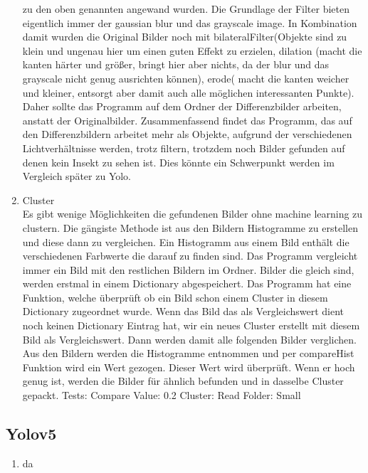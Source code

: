 \documentclass[11pt]{scrartcl}
\begin{document}
\begin{enumerate}
    zu den oben genannten angewand wurden. Die Grundlage der Filter bieten eigentlich immer der gaussian blur und das grayscale image. 
    In Kombination damit wurden die Original Bilder noch mit bilateralFilter(Objekte sind zu klein und ungenau hier um einen guten Effekt zu erzielen,
    dilation (macht die kanten härter und größer, bringt hier aber nichts, da der blur und das grayscale nicht genug ausrichten können),
    erode( macht die kanten weicher und kleiner, entsorgt aber damit auch alle möglichen interessanten Punkte).
    Daher sollte das Programm auf dem Ordner der Differenzbilder arbeiten, anstatt der Originalbilder.
    Zusammenfassend findet das Programm, das auf den Differenzbildern arbeitet mehr als Objekte, aufgrund der verschiedenen Lichtverhältnisse
    werden, trotz filtern, trotzdem noch Bilder gefunden auf denen kein Insekt zu sehen ist. Dies könnte ein Schwerpunkt werden im Vergleich später
    zu Yolo.
    \item Cluster \\
    Es gibt wenige Möglichkeiten die gefundenen Bilder ohne machine learning zu clustern. Die gängiste Methode ist aus den Bildern Histogramme zu erstellen und diese
    dann zu vergleichen. Ein Histogramm aus einem Bild enthält die verschiedenen Farbwerte die darauf zu finden sind. Das Programm vergleicht immer ein Bild mit den restlichen Bildern
    im Ordner. Bilder die gleich sind, werden erstmal in einem Dictionary abgespeichert. Das Programm hat eine Funktion, welche überprüft ob ein Bild
    schon einem Cluster in diesem Dictionary zugeordnet wurde. Wenn das Bild das als Vergleichswert dient noch keinen Dictionary Eintrag hat, wir ein neues
    Cluster erstellt mit diesem Bild als Vergleichswert. Dann werden damit alle folgenden Bilder verglichen. Aus den Bildern werden die Histogramme entnommen
    und per compareHist Funktion wird ein Wert gezogen. Dieser Wert wird überprüft. Wenn er hoch genug ist, werden die Bilder für ähnlich
    befunden und in dasselbe Cluster gepackt. Tests:
    Compare Value: 0.2
    Cluster:
    Read Folder: Small
\end{enumerate}

\subsection{Yolov5}

\begin{enumerate}
    \item da
    
\end{enumerate}
\end{document}
